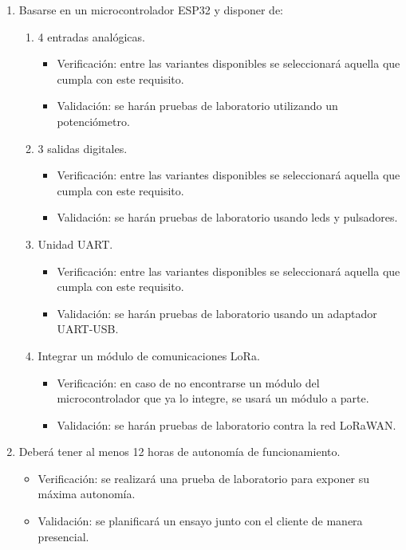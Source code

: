 \documentclass[11pt]{charter}
\begin{document}
\begin{enumerate}
\begin{enumerate}[label*=\arabic*.]
			\item Basarse en un microcontrolador ESP32 y disponer de:
			\begin{enumerate}[label*=\arabic*.]
				\item 4 entradas analógicas.
					\begin{itemize}
							\item Verificación: entre las variantes disponibles se seleccionará aquella que cumpla con este requisito.\\
							\item Validación: se harán pruebas de laboratorio utilizando un potenciómetro.\\
					\end{itemize}
				\item 3 salidas digitales.
					\begin{itemize}
						\item Verificación: entre las variantes disponibles se seleccionará aquella que cumpla con este requisito.\\
						\item Validación: se harán pruebas de laboratorio usando leds y pulsadores.\\
					\end{itemize}
				\item Unidad UART.
					\begin{itemize}
						\item Verificación: entre las variantes disponibles se seleccionará aquella que cumpla con este requisito.\\
						\item Validación: se harán pruebas de laboratorio usando un adaptador UART-USB.\\
					\end{itemize}
				\item Integrar un módulo de comunicaciones LoRa.
					\begin{itemize}
						\item Verificación: en caso de no encontrarse un módulo del microcontrolador que ya lo integre, se usará un módulo a parte.\\
						\item Validación: se harán pruebas de laboratorio contra la red LoRaWAN.\\
					\end{itemize}
			\end{enumerate}
			
			\item Deberá tener al menos 12 horas de autonomía de funcionamiento.
				\begin{itemize}
					\item Verificación: se realizará una prueba de laboratorio para exponer su máxima autonomía.\\
					\item Validación: se planificará un ensayo junto con el cliente de manera presencial.\\
				\end{itemize}
			

\end{enumerate}
\end{enumerate}
\end{document}
